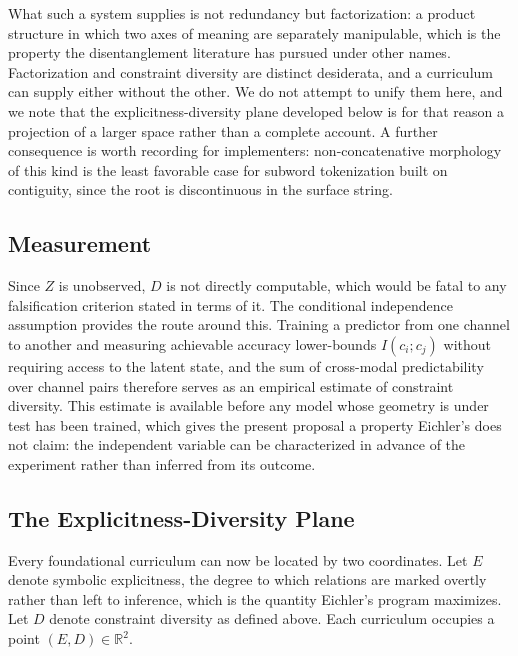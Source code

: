 \documentclass[11pt]{article}
\begin{document}
What such a system supplies is not redundancy but factorization: a product structure in which two axes of meaning are separately manipulable, which is the property the disentanglement literature has pursued under other names. Factorization and constraint diversity are distinct desiderata, and a curriculum can supply either without the other. We do not attempt to unify them here, and we note that the explicitness-diversity plane developed below is for that reason a projection of a larger space rather than a complete account. A further consequence is worth recording for implementers: non-concatenative morphology of this kind is the least favorable case for subword tokenization built on contiguity, since the root is discontinuous in the surface string.

\subsection{Measurement}

Since $Z$ is unobserved, $D$ is not directly computable, which would be fatal to any falsification criterion stated in terms of it. The conditional independence assumption provides the route around this. Training a predictor from one channel to another and measuring achievable accuracy lower-bounds $I(c_i;c_j)$ without requiring access to the latent state, and the sum of cross-modal predictability over channel pairs therefore serves as an empirical estimate of constraint diversity. This estimate is available before any model whose geometry is under test has been trained, which gives the present proposal a property Eichler's does not claim: the independent variable can be characterized in advance of the experiment rather than inferred from its outcome.

\subsection{The Explicitness-Diversity Plane}

Every foundational curriculum can now be located by two coordinates. Let $E$ denote symbolic explicitness, the degree to which relations are marked overtly rather than left to inference, which is the quantity Eichler's program maximizes. Let $D$ denote constraint diversity as defined above. Each curriculum occupies a point $(E,D)\in\mathbb{R}^2$.
\end{document}
